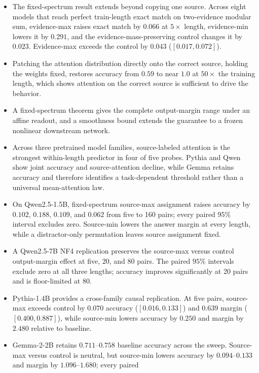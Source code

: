 \documentclass[letterpaper]{article} %
\begin{document}
\begin{itemize}
agreement. The source has positive local utility in $89.2\%$ of active head-example pairs, making the
theorem's boundary measurable rather than assumed.
\item The fixed-spectrum result extends beyond copying one source. Across eight models that reach perfect
train-length exact match on two-evidence modular sum, evidence-max raises exact match by $0.066$ at
$5\times$ length, evidence-min lowers it by $0.291$, and the evidence-mass-preserving control changes it by
$0.023$. Evidence-max exceeds the control by $0.043$ ($[0.017,0.072]$).
\item Patching the attention distribution directly onto the correct source, holding the weights fixed,
restores accuracy from $0.59$ to near $1.0$ at $50\times$ the training length, which shows attention on the
correct source is sufficient to drive the behavior.
\item A fixed-spectrum theorem gives the complete output-margin range under an affine readout, and a
smoothness bound extends the guarantee to a frozen nonlinear downstream network.
\item Across three pretrained model families, source-labeled attention is the strongest within-length
predictor in four of five probes. Pythia and Qwen show joint accuracy and source-attention decline, while
Gemma retains accuracy and therefore identifies a task-dependent threshold rather than a universal
mean-attention law.
\item On Qwen2.5-1.5B, fixed-spectrum source-max assignment raises accuracy by $0.102$, $0.188$, $0.109$,
and $0.062$ from five to 160 pairs; every paired $95\%$ interval excludes zero. Source-min lowers the
answer margin at every length, while a distractor-only permutation leaves source assignment fixed.
\item A Qwen2.5-7B NF4 replication preserves the source-max versus control output-margin effect at five,
20, and 80 pairs. The paired $95\%$ intervals exclude zero at all three lengths; accuracy improves
significantly at 20 pairs and is floor-limited at 80.
\item Pythia-1.4B provides a cross-family causal replication. At five pairs, source-max exceeds control by
$0.070$ accuracy ($[0.016,0.133]$) and $0.639$ margin ($[0.400,0.887]$), while source-min lowers accuracy
by $0.250$ and margin by $2.480$ relative to baseline.
\item Gemma-2-2B retains $0.711$--$0.758$ baseline accuracy across the sweep. Source-max versus control is
neutral, but source-min lowers accuracy by $0.094$--$0.133$ and margin by $1.096$--$1.680$; every paired

\end{itemize}
\end{document}
